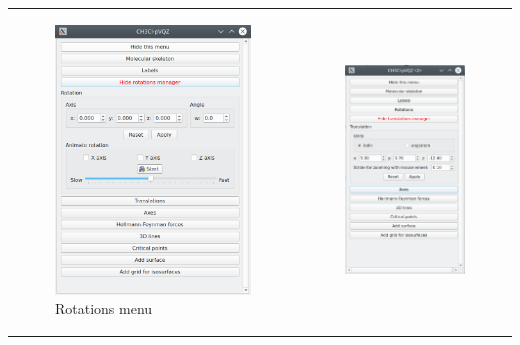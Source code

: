 \documentclass[10pt]{article}
\begin{document}
\begin{center}
\begin{tabular}{lr}
\begin{minipage}{.35\linewidth}
    \begin{figure}[H]
        \begin{center}
            \includegraphics[width=0.64\linewidth]{damqt320_rotations}
        \end{center}
        \caption{Rotations menu \label{fig:4_13_3_1}}
    \end{figure}
\end{minipage}
&
\begin{minipage}{.35\linewidth}
    \begin{figure}[H]
        \begin{center}
            \includegraphics[width=0.5\linewidth]{damqt320_translations.png}

\end{center}
\end{figure}
\end{minipage}
\end{tabular}
\end{center}
\end{document}
